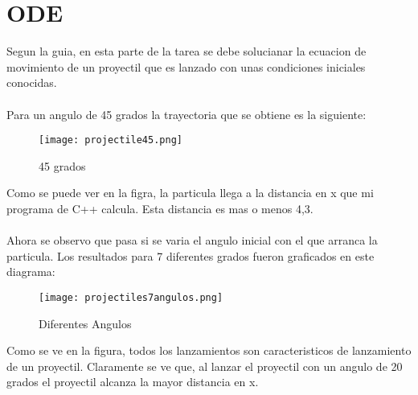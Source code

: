 \documentclass{article}[11]
\title{Tarea #4 Metodos Computacionales}
\author{Felipe Bonilla W\\Universidad de Los Andes}
\date{19 de Noviembre del 2018}
\begin{document}
\maketitle
\begin{abstract}
Mediante los programas de Python, C++ y Make se espera resolver una ecuacion diferencial ordinaria y una ecuacion diferencial parcial. La idea es que estas dos ecuaciones sean resueltas y arrojen datos que permitan obtener una serie de diagramas que seran analizados para emtender lo sucedido. Ademas, por medio de un archivo de Make, se espera poder combinar todos los archivos y lograr que este informe sea completado por las graficas, que varian segun los datos.
\end{abstract}

    
\section{ODE}
Segun la guia, en esta parte de la tarea se debe solucianar la ecuacion de movimiento de un proyectil que es lanzado con unas condiciones iniciales conocidas.
\\
\\
Para un angulo de 45 grados la trayectoria que se obtiene es la siguiente:


\begin{figure}
    \centering
    \texttt{[image: projectile45.png]}
    \caption{45 grados}
    \label{fig:my_label}
\end{figure}


Como se puede ver en la figra, la particula llega a la distancia en x que mi programa de C++ calcula. Esta distancia es mas o menos 4,3.
\\
\\
Ahora se observo que pasa si se varia el angulo inicial con el que arranca la particula. Los resultados para 7 diferentes grados fueron graficados en este diagrama:

\begin{figure}
    \centering
    \texttt{[image: projectiles7angulos.png]}
    \caption{Diferentes Angulos}
    \label{fig:my_label}
\end{figure}

Como se ve en la figura, todos los lanzamientos son caracteristicos de lanzamiento de un proyectil. Claramente se ve que, al lanzar el proyectil con un angulo de 20 grados el proyectil alcanza la mayor distancia en x.
\end{document}
